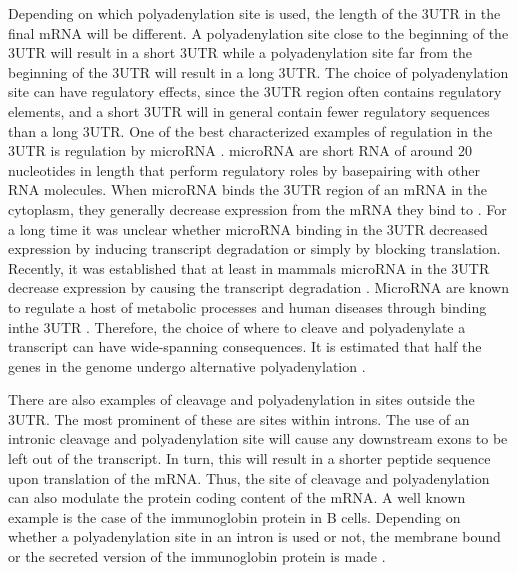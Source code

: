 Depending on which polyadenylation site is used, the length of the 3\ppp UTR in the
final mRNA will be different. A polyadenylation site close to the beginning of the
3\ppp UTR will result in a short 3\ppp UTR while a polyadenylation site far from the
beginning of the 3\ppp UTR will result in a long 3\ppp UTR. The choice of
polyadenylation site can have regulatory effects, since the 3\ppp UTR region often
contains regulatory elements, and a short 3\ppp UTR will in general contain
fewer regulatory sequences than a long 3\ppp UTR. One of the best characterized
examples of regulation in the 3\ppp UTR is regulation by microRNA
\cite{digiammartino_mechanisms_2011}. microRNA are short RNA of around 20
nucleotides in length that perform regulatory roles by basepairing with other
RNA molecules. When microRNA binds the 3\ppp UTR region of an mRNA in the
cytoplasm, they generally decrease expression from the mRNA they bind to
\cite{bartel_micrornas:_2004}. For a long time it was unclear whether microRNA
binding in the 3\ppp UTR decreased expression by inducing transcript
degradation or simply by blocking translation. Recently, it was established
that at least in mammals microRNA in the 3\ppp UTR decrease expression by
causing the transcript degradation \cite{huntzinger_gene_2011}. MicroRNA are
known to regulate a host of metabolic processes and human diseases through
binding inthe 3\ppp UTR \cite{huang_biological_2010}. Therefore, the choice of
where to cleave and polyadenylate a transcript can have wide-spanning
consequences. It is estimated that half the genes in the genome undergo
alternative polyadenylation \cite{tian_large-scale_2005}.

There are also examples of cleavage and polyadenylation in sites outside the
3\ppp UTR. The most prominent of these are sites within introns. The use of an
intronic cleavage and polyadenylation site will cause any downstream exons to be left
out of the transcript. In turn, this will result in a shorter peptide sequence
upon translation of the mRNA. Thus, the site of cleavage and polyadenylation
can also modulate the protein coding content of the mRNA. A well known example
is the case of the immunoglobin protein in B cells. Depending on whether a
polyadenylation site in an intron is used or not, the membrane bound or the secreted
version of the immunoglobin protein is made \cite{peterson_regulated_1989}.

